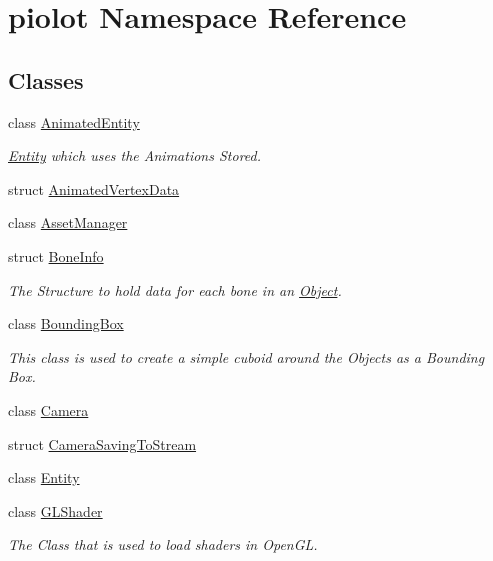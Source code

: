 \hypertarget{namespacepiolot}{}\section{piolot Namespace Reference}
\label{namespacepiolot}
\subsection*{Classes}
\begin{DoxyCompactItemize}
\item 
class \mbox{\hyperlink{classpiolot_1_1_animated_entity}{Animated\+Entity}}
\begin{DoxyCompactList}\small\item\em \mbox{\hyperlink{classpiolot_1_1_entity}{Entity}} which uses the Animations Stored. \end{DoxyCompactList}\item 
struct \mbox{\hyperlink{structpiolot_1_1_animated_vertex_data}{Animated\+Vertex\+Data}}
\item 
class \mbox{\hyperlink{classpiolot_1_1_asset_manager}{Asset\+Manager}}
\item 
struct \mbox{\hyperlink{structpiolot_1_1_bone_info}{Bone\+Info}}
\begin{DoxyCompactList}\small\item\em The Structure to hold data for each bone in an \mbox{\hyperlink{classpiolot_1_1_object}{Object}}. \end{DoxyCompactList}\item 
class \mbox{\hyperlink{classpiolot_1_1_bounding_box}{Bounding\+Box}}
\begin{DoxyCompactList}\small\item\em This class is used to create a simple cuboid around the Objects as a Bounding Box. \end{DoxyCompactList}\item 
class \mbox{\hyperlink{classpiolot_1_1_camera}{Camera}}
\item 
struct \mbox{\hyperlink{structpiolot_1_1_camera_saving_to_stream}{Camera\+Saving\+To\+Stream}}
\item 
class \mbox{\hyperlink{classpiolot_1_1_entity}{Entity}}
\item 
class \mbox{\hyperlink{classpiolot_1_1_g_l_shader}{G\+L\+Shader}}
\begin{DoxyCompactList}\small\item\em The Class that is used to load shaders in Open\+GL. \end{DoxyCompactList}\item 

\end{DoxyCompactItemize}
